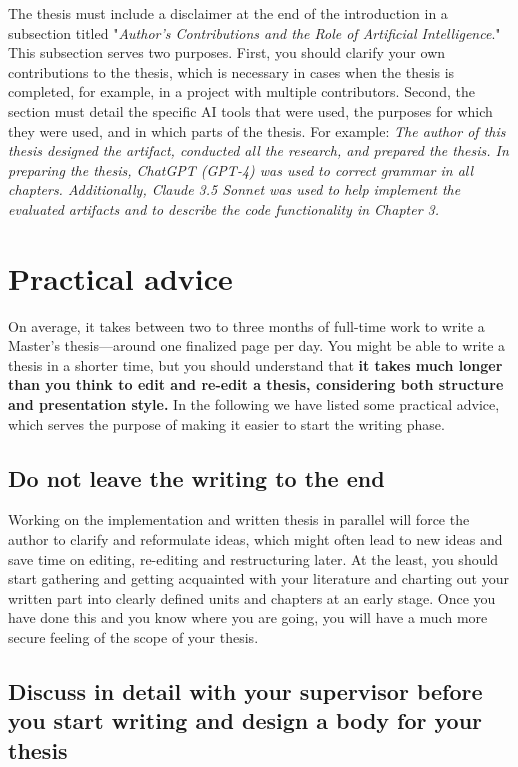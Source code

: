 The thesis must include a disclaimer at the end of the introduction in a subsection titled "\textit{Author's Contributions and the Role of Artificial Intelligence}." This subsection serves two purposes. First, you should clarify your own contributions to the thesis, which is necessary in cases when the thesis is completed, for example, in a project with multiple contributors. Second, the section must detail the specific AI tools that were used, the purposes for which they were used, and in which parts of the thesis. For example: \textit{The author of this thesis designed the artifact, conducted all the research, and prepared the thesis. In preparing the thesis, ChatGPT (GPT-4) was used to correct grammar in all chapters. Additionally, Claude 3.5 Sonnet was used to help implement the evaluated artifacts and to describe the code functionality in Chapter 3.}




\section{Practical advice}

On average, it takes between two to three months of full-time work to write a Master’s thesis---around one finalized page per day. You might be able to write a thesis in a shorter time, but you should understand that \textbf{it takes much longer than you think to edit and re-edit a thesis, considering both structure and presentation style.} In the following we have listed some practical advice, which serves the purpose of making it easier to start the writing phase.

\subsection{Do not leave the writing to the end}

Working on the implementation and written thesis in parallel will force the author to clarify and reformulate ideas, which might often lead to new ideas and save time on editing, re-editing and restructuring later. At the least, you should start gathering and getting acquainted with your literature and charting out your written part into clearly defined units and chapters at an early stage. Once you have done this and you know where you are going, you will have a much more secure feeling of the scope of your thesis.

\subsection{Discuss in detail with your supervisor before you start writing and design a
body for your thesis}

